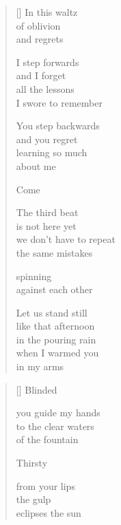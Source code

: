 \documentclass[12pt,a4paper]{article}
\begin{document}
\begin{verse}[\versewidth]
  In this waltz \\
  of oblivion \\
  and regrets

  I step forwards \\
  and I forget \\
  all the lessons \\
  I swore to remember

  You step backwards \\
  and you regret \\
  learning so much \\
  about me

  Come

  The third beat \\
  is not here yet \\

  we don't have to repeat \\
  the same mistakes

  spinning \\
  against each other

  Let us stand still \\
  like that afternoon \\
  in the pouring rain \\
  when I warmed you \\
  in my arms
\end{verse}


\newpage

\poemtitle{}

\settowidth{\versewidth}{to the clear waters}

\bigskip

\begin{verse}[\versewidth]
  Blinded

  you guide my hands \\
  to the clear waters \\
  of the fountain

  Thirsty

  from your lips \\
  the gulp \\
  eclipses the sun
\end{verse}


\newpage
\end{document}
